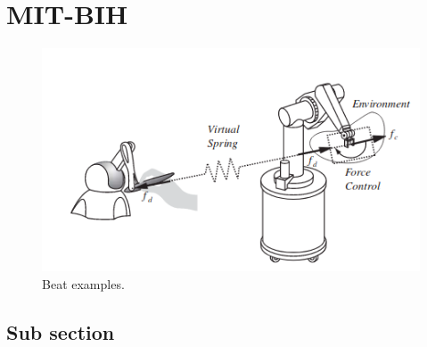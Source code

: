 \section{MIT-BIH}

\begin{figure}[htb]
    \begin{center}  
        \includegraphics[scale=0.6]{images/haptic.png}
    \end{center}
    \caption{Beat examples.}
    \label{fig_mitbih}
\end{figure}

\subsection{Sub section}

